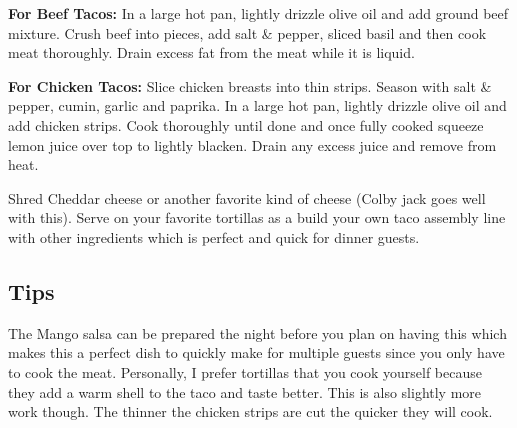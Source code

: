 \textbf{For Beef Tacos:} In a large hot pan, lightly drizzle olive oil and add ground beef mixture. Crush beef into pieces, add salt \& pepper, sliced basil and then cook meat thoroughly. Drain excess fat from the meat while it is liquid. 

\textbf{For Chicken Tacos:} Slice chicken breasts into thin strips. Season with salt \& pepper, cumin, garlic and paprika. In a large hot pan, lightly drizzle olive oil and add chicken strips.  Cook thoroughly until done and once fully cooked squeeze lemon juice over top to lightly blacken. Drain any excess juice and remove from heat.

Shred Cheddar cheese or another favorite kind of cheese (Colby jack goes well with this). Serve on your favorite tortillas as a build your own taco assembly line with other ingredients which is perfect and quick for dinner guests.

\subsection*{Tips}

The Mango salsa can be prepared the night before you plan on having this which makes this a perfect dish to quickly make for multiple guests since you only have to cook the meat. Personally, I prefer tortillas that you cook yourself because they add a warm shell to the taco and taste better. This is also slightly more work though. The thinner the chicken strips are cut the quicker they will cook. 